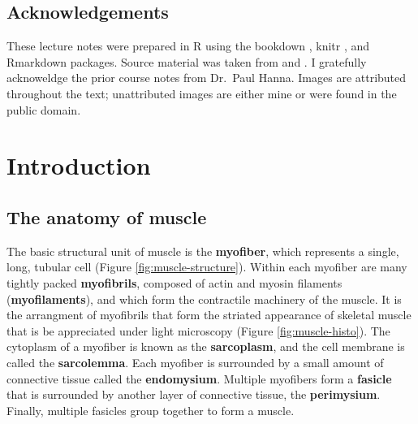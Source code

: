 \documentclass[openany]{book}
\begin{document}
\section*{Acknowledgements}\label{acknowledgements}

These lecture notes were prepared in R \citep{R-base} using the bookdown
\citep{xie2015}, knitr \citep{R-knitr}, and Rmarkdown
\citep{R-rmarkdown} packages. Source material was taken from
\citet{zachary2016pathologic} and \citet{maxie2015jubb}. I gratefully
acknoweldge the prior course notes from Dr.~Paul Hanna. Images are
attributed throughout the text; unattributed images are either mine or
were found in the public domain.

\chapter{Introduction}\label{intro}

\hypertarget{the-anatomy-of-muscle}{\section{The anatomy of
muscle}\label{the-anatomy-of-muscle}}

The basic structural unit of muscle is the \textbf{myofiber}, which
represents a single, long, tubular cell (Figure
\ref{fig:muscle-structure}). Within each myofiber are many tightly
packed \textbf{myofibrils}, composed of actin and myosin filaments
(\textbf{myofilaments}), and which form the contractile machinery of the
muscle. It is the arrangment of myofibrils that form the striated
appearance of skeletal muscle that is be appreciated under light
microscopy (Figure \ref{fig:muscle-histo}). The cytoplasm of a myofiber
is known as the \textbf{sarcoplasm}, and the cell membrane is called the
\textbf{sarcolemma}. Each myofiber is surrounded by a small amount of
connective tissue called the \textbf{endomysium}. Multiple myofibers
form a \textbf{fasicle} that is surrounded by another layer of
connective tissue, the \textbf{perimysium}. Finally, multiple fasicles
group together to form a muscle.
\end{document}

